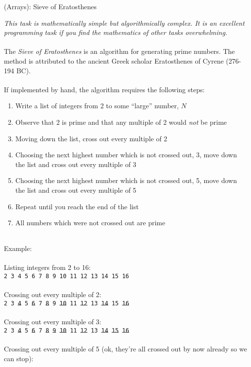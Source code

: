 \documentclass{lab}
\begin{document}
\pagebreak
\begin{task}{(Arrays): Sieve of Eratosthenes}{}

\textit{This task is mathematically simple but algorithmically complex. It is an excellent programming task if you find the mathematics of other tasks overwhelming.}
\\~\\
The \textit{Sieve of Eratosthenes} is an algorithm for generating prime numbers. The method is attributed to the ancient Greek scholar Eratosthenes of Cyrene (276-194 BC).
\\~\\
If implemented by hand, the algorithm requires the following steps:

\begin{enumerate}
\item Write a list of integers from 2 to some ``large'' number, $N$
\item Observe that 2 is prime and that any multiple of 2 would \textit{not} be prime
\item Moving down the list, cross out every multiple of 2
\item Choosing the next highest number which is not crossed out, 3, move down the list and cross out every multiple of 3
\item Choosing the next highest number which is not crossed out, 5, move down the list and cross out every multiple of 5
\item Repeat until you reach the end of the list
\item All numbers which were not crossed out are prime
\end{enumerate}
~\\
Example:
\\~\\
Listing integers from 2 to 16:\\
\texttt{2 3 4 5 6 7 8 9 10 11 12 13 14 15 16}
\\~\\
Crossing out every multiple of 2:\\
\texttt{2 3 \st{4} 5 \st{6} 7 \st{8} 9 \st{10} 11 \st{12} 13 \st{14} 15 \st{16}}
\\~\\
Crossing out every multiple of 3:\\
\texttt{2 3 \st{4} 5 \st{6} 7 \st{8} \st{9} \st{10} 11 \st{12} 13 \st{14} \st{15} \st{16}}
\\~\\
Crossing out every multiple of 5 (ok, they're all crossed out by now already so we can stop):\\

\end{task}
\end{document}

